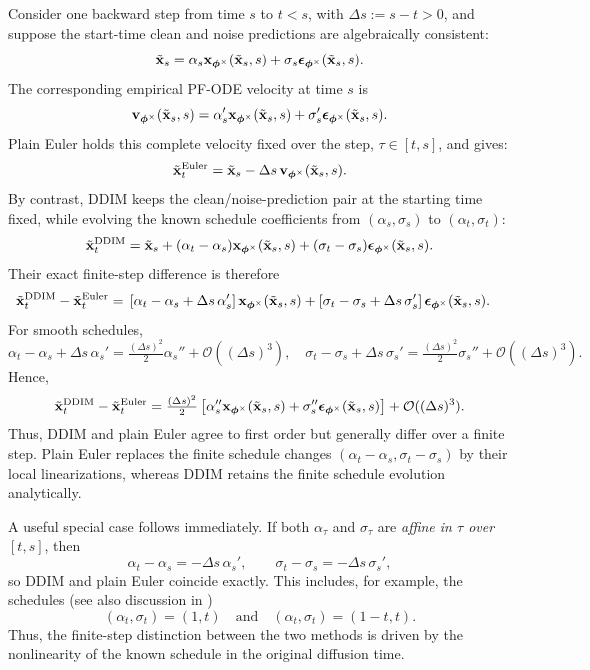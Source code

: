 Consider one backward step from time $s$ to $t<s$, with
$\Delta s:=s-t>0$, and suppose the start-time clean and noise predictions are
algebraically consistent:
\[
\tilde{{\mathbf{x}}}_s
=
\alpha_s
{\mathbf{x}}_{\bm{\phi}^\times}(\tilde{{\mathbf{x}}}_s,s)
+
\sigma_s
{\bm{\epsilon}}_{\bm{\phi}^\times}(\tilde{{\mathbf{x}}}_s,s).
\]
The corresponding empirical PF-ODE velocity at time $s$ is
\[
{\mathbf{v}}_{\bm{\phi}^\times}(\tilde{{\mathbf{x}}}_s,s)
=
\alpha_s'
{\mathbf{x}}_{\bm{\phi}^\times}(\tilde{{\mathbf{x}}}_s,s)
+
\sigma_s'
{\bm{\epsilon}}_{\bm{\phi}^\times}(\tilde{{\mathbf{x}}}_s,s).
\]
Plain Euler holds this complete velocity fixed over the step, $\tau\in[t,s]$, and gives:
\[
\tilde{{\mathbf{x}}}_t^{\mathrm{Euler}}
=
\tilde{{\mathbf{x}}}_s
-
\Delta s\,
{\mathbf{v}}_{\bm{\phi}^\times}(\tilde{{\mathbf{x}}}_s,s).
\]
By contrast, DDIM keeps the clean/noise-prediction pair at the starting time fixed, while evolving the known schedule coefficients from $(\alpha_s,\sigma_s)$ to $(\alpha_t,\sigma_t)$:
\[
\tilde{{\mathbf{x}}}_t^{\mathrm{DDIM}}
=
\tilde{{\mathbf{x}}}_s
+
(\alpha_t-\alpha_s)
{\mathbf{x}}_{\bm{\phi}^\times}(\tilde{{\mathbf{x}}}_s,s)
+
(\sigma_t-\sigma_s)
{\bm{\epsilon}}_{\bm{\phi}^\times}(\tilde{{\mathbf{x}}}_s,s).
\]
Their exact finite-step difference is therefore
\begin{align*}
\tilde{{\mathbf{x}}}_t^{\mathrm{DDIM}}
-
\tilde{{\mathbf{x}}}_t^{\mathrm{Euler}}
={}&
\left[
\alpha_t-\alpha_s+\Delta s\,\alpha_s'
\right]
{\mathbf{x}}_{\bm{\phi}^\times}(\tilde{{\mathbf{x}}}_s,s)
+
\left[
\sigma_t-\sigma_s+\Delta s\,\sigma_s'
\right]
{\bm{\epsilon}}_{\bm{\phi}^\times}(\tilde{{\mathbf{x}}}_s,s).
\end{align*}
For smooth schedules,
\[
\alpha_t-\alpha_s+\Delta s\,\alpha_s'
=
\tfrac{(\Delta s)^2}{2}\alpha_s''
+
\mathcal O((\Delta s)^3), \quad
\sigma_t-\sigma_s+\Delta s\,\sigma_s'
=
\tfrac{(\Delta s)^2}{2}\sigma_s''
+
\mathcal O((\Delta s)^3).
\]
Hence,
\begin{align*}
\tilde{{\mathbf{x}}}_t^{\mathrm{DDIM}}
-
\tilde{{\mathbf{x}}}_t^{\mathrm{Euler}}
=
\tfrac{(\Delta s)^2}{2}
\left[
\alpha_s''
{\mathbf{x}}_{\bm{\phi}^\times}(\tilde{{\mathbf{x}}}_s,s)
+
\sigma_s''
{\bm{\epsilon}}_{\bm{\phi}^\times}(\tilde{{\mathbf{x}}}_s,s)
\right]
+
\mathcal O((\Delta s)^3).
\end{align*}
Thus, DDIM and plain Euler agree to first order but generally differ over a
finite step. Plain Euler replaces the finite schedule changes
$(\alpha_t-\alpha_s,\sigma_t-\sigma_s)$ by their local linearizations,
whereas DDIM retains the finite schedule evolution analytically.

A useful special case follows immediately. If both $\alpha_\tau$ and
$\sigma_\tau$ are \emph{affine in $\tau$ over $[t,s]$}, then
\[
\alpha_t-\alpha_s=-\Delta s\,\alpha_s',
\qquad
\sigma_t-\sigma_s=-\Delta s\,\sigma_s',
\]
so DDIM and plain Euler coincide exactly. This includes, for example, the
schedules (see also discussion in ) 
\[(\alpha_t,\sigma_t)=(1,t)\quad \text{and}\quad (\alpha_t,\sigma_t)=(1-t,t) .
\]
Thus, the finite-step distinction between the
two methods is driven by the nonlinearity of the known schedule in the
original diffusion time.



